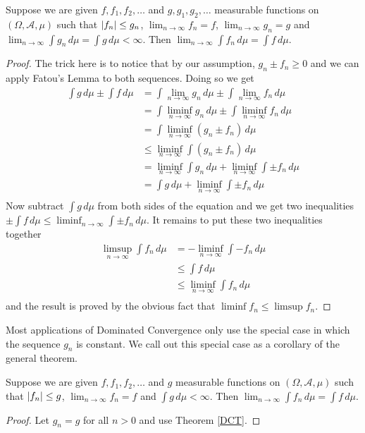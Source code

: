 \begin{thm}\label{DCT}Suppose we are given $f, f_1, f_2, \dots$ and $g,g_1,g_2,
  \dots$ measurable functions on $(\Omega,
  \mathcal{A}, \mu)$ such that $\left \vert f_n \right \vert \leq g_n$, $\lim_{n \to
    \infty} f_n = f$, $\lim_{n \to
    \infty} g_n = g$ and $\lim_{n \to \infty} \int g_n \, d \mu  =
  \int g \, d \mu < \infty$.  Then $\lim_{n \to \infty} \int f_n \,
  d\mu = \int f \, d\mu$.
\end{thm}
\begin{proof}The trick here is to notice that by our assumption, $g_n
  \pm f_n \geq 0$ and we can apply Fatou's Lemma to both sequences.
  Doing so we get
\begin{align*}
\int g \, d\mu \pm \int f \, d\mu &= \int \lim_{n \to \infty} g_n \,
d\mu \pm \int \lim_{n \to \infty}  f_n \, d\mu \\
&=\int \liminf_{n \to \infty} g_n \,
d\mu \pm \int \liminf_{n \to \infty}  f_n \, d\mu \\
&=\int \liminf_{n \to \infty} \left (g_n  \pm  f_n \right ) \, d\mu \\
&\leq \liminf_{n \to \infty} \int \left (g_n  \pm  f_n \right ) \, d\mu \\
&= \liminf_{n \to \infty} \int g_n \, d\mu + \liminf_{n \to \infty} \int \pm  f_n  \, d\mu \\
&= \int g \, d\mu + \liminf_{n \to \infty} \int \pm  f_n  \, d\mu \\
\end{align*}
Now subtract $\int g \, d\mu$ from both sides of the equation and we
get two inequalities $\pm \int f \, d\mu \leq \liminf_{n \to \infty}
\int \pm  f_n  \, d\mu $.  It remains to put these two inequalities
together 
\begin{align*}
\limsup_{n \to \infty} \int f_n \, d\mu &= -\liminf_{n \to \infty}
\int -f_n \, d\mu \\
&\leq \int f \, d\mu \\
&\leq \liminf_{n \to \infty} \int f_n \, d\mu \\
\end{align*}
and the result is proved by the
obvious fact that $\liminf f_n \leq \limsup f_n$.
\end{proof}
Most applications of Dominated Convergence only use the special case in
which the sequence $g_n$ is constant.  We call out this special case
as a corollary of the general theorem.
\begin{cor}Suppose we are given $f, f_1, f_2, \dots$ and $g$ measurable functions on $(\Omega,
  \mathcal{A}, \mu)$ such that $\left \vert f_n \right \vert \leq g$, $\lim_{n \to
    \infty} f_n = f$ and $\int g \, d \mu < \infty$.  Then $\lim_{n \to \infty} \int f_n \,
  d\mu = \int f \, d\mu$.
\end{cor}
\begin{proof}Let $g_n = g$ for all $n>0$ and use Theorem \ref{DCT}.
\end{proof}

